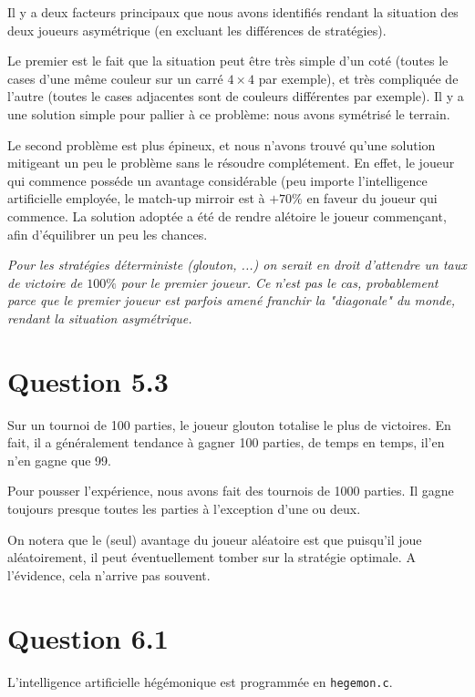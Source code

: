 \documentclass[a4paper,11pt]{article}
\newenvironment{remarque}%
{\description\item[Remarque.]\sl}%
{\enddescription}
\begin{document}
Il y a deux facteurs principaux que nous avons identifiés rendant la situation des deux joueurs asymétrique (en excluant les différences de stratégies).

Le premier est le fait que la situation peut être très simple d'un coté (toutes le cases d'une même couleur sur un carré $4\times 4$ par exemple), et très compliquée de l'autre (toutes le cases adjacentes sont de couleurs différentes par exemple). Il y a une solution simple pour pallier à ce problème: nous avons symétrisé le terrain.

Le second problème est plus épineux, et nous n'avons trouvé qu'une solution mitigeant un peu le problème sans le résoudre complétement. En effet, le joueur qui commence posséde un avantage considérable (peu importe l'intelligence artificielle employée, le match-up mirroir est à $+70\%$ en faveur du joueur qui commence. La solution adoptée a été de rendre alétoire le joueur commençant, afin d'équilibrer un peu les chances.

\begin{remarque}
  Pour les stratégies déterministe (glouton, ...) on serait en droit d'attendre un taux de victoire de $100\%$ pour le premier joueur. Ce n'est pas le cas, probablement parce que le premier joueur est parfois amené franchir la "diagonale" du monde, rendant la situation asymétrique.
\end{remarque}

\section*{Question 5.3}

Sur un tournoi de 100 parties, le joueur glouton totalise le plus de victoires. En fait, il a généralement tendance à gagner 100 parties, de temps en temps, il'en n'en gagne que 99.

Pour pousser l'expérience, nous avons fait des tournois de 1000 parties. Il gagne toujours presque toutes les parties à l'exception d'une ou deux.

On notera que le (seul) avantage du joueur aléatoire est que puisqu'il joue aléatoirement, il peut éventuellement tomber sur la stratégie optimale. A l'évidence, cela n'arrive pas souvent.

\section*{Question 6.1}

L'intelligence artificielle hégémonique est programmée en \texttt{hegemon.c}.
\end{document}
